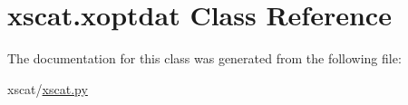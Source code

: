 \hypertarget{classxscat_1_1xoptdat}{}\section{xscat.\+xoptdat Class Reference}
\label{classxscat_1_1xoptdat}


The documentation for this class was generated from the following file\+:\begin{DoxyCompactItemize}
\item 
xscat/\hyperlink{xscat_8py}{xscat.\+py}\end{DoxyCompactItemize}
